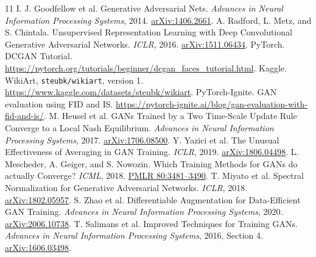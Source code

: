 \documentclass{article}
\begin{document}
\clearpage
\begin{thebibliography}{11}
I. J. Goodfellow et al. Generative Adversarial Nets.
\emph{Advances in Neural Information Processing Systems}, 2014.
\href{https://arxiv.org/abs/1406.2661}{arXiv:1406.2661}.
A. Radford, L. Metz, and S. Chintala. Unsupervised
Representation Learning with Deep Convolutional Generative Adversarial Networks.
\emph{ICLR}, 2016. \href{https://arxiv.org/abs/1511.06434}{arXiv:1511.06434}.
PyTorch. DCGAN Tutorial.
\url{https://pytorch.org/tutorials/beginner/dcgan_faces_tutorial.html}.
Kaggle. WikiArt, \texttt{steubk/wikiart}, version 1.
\url{https://www.kaggle.com/datasets/steubk/wikiart}.
PyTorch-Ignite. GAN evaluation using FID and IS.
\url{https://pytorch-ignite.ai/blog/gan-evaluation-with-fid-and-is/}.
M. Heusel et al. GANs Trained by a Two Time-Scale Update Rule
Converge to a Local Nash Equilibrium.
\emph{Advances in Neural Information Processing Systems}, 2017.
\href{https://arxiv.org/abs/1706.08500}{arXiv:1706.08500}.
Y. Yazici et al. The Unusual Effectiveness of Averaging in GAN
Training. \emph{ICLR}, 2019.
\href{https://arxiv.org/abs/1806.04498}{arXiv:1806.04498}.
L. Mescheder, A. Geiger, and S. Nowozin. Which Training Methods
for GANs do actually Converge? \emph{ICML}, 2018.
\href{https://proceedings.mlr.press/v80/mescheder18a.html}{PMLR 80:3481--3490}.
T. Miyato et al. Spectral Normalization for Generative Adversarial
Networks. \emph{ICLR}, 2018.
\href{https://arxiv.org/abs/1802.05957}{arXiv:1802.05957}.
S. Zhao et al. Differentiable Augmentation for Data-Efficient
GAN Training. \emph{Advances in Neural Information Processing Systems}, 2020.
\href{https://arxiv.org/abs/2006.10738}{arXiv:2006.10738}.
T. Salimans et al. Improved Techniques for Training GANs.
\emph{Advances in Neural Information Processing Systems}, 2016, Section 4.
\href{https://arxiv.org/abs/1606.03498}{arXiv:1606.03498}.
\end{thebibliography}
\end{document}
